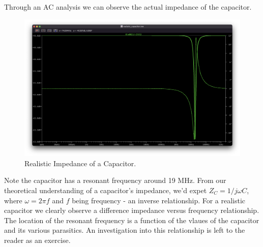 \documentclass{article}
\begin{document}
Through an AC analysis we can observe the actual impedance of the capacitor.
\begin{figure}[H]
    \includegraphics[width=\textwidth]{images/ltspice_realistic_capacitor.png}
    \caption{Realistic Impedance of a Capacitor.}
\end{figure}
Note the capacitor has a resonant frequency around 19 MHz. From our theoretical understanding of a capacitor's impedance, we'd expet $Z_{C} = 1/{j\omega C}$, where $\omega = 2\pi f$ and $f$ being frequency - an inverse relationship.
For a realistic capacitor we clearly observe a difference impedance versus frequency relationship.
The location of the resonant frequency is a function of the vlaues of the capacitor and its various parasitics. An investigation into this relationship is left to the reader as an exercise.

\pagebreak
\end{document}
